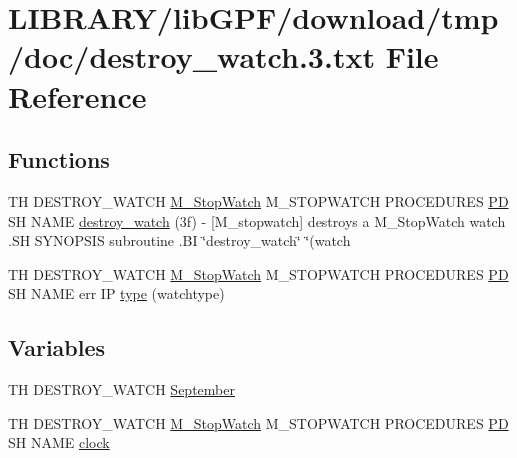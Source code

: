 \hypertarget{destroy__watch_83_8txt}{}\section{L\+I\+B\+R\+A\+R\+Y/lib\+G\+P\+F/download/tmp/doc/destroy\+\_\+watch.3.txt File Reference}
\label{destroy__watch_83_8txt}
\subsection*{Functions}
\begin{DoxyCompactItemize}
\item 
TH D\+E\+S\+T\+R\+O\+Y\+\_\+\+W\+A\+T\+CH \hyperlink{option__stopwatch_83_8txt_aa2011fc45a5e502e87ee50996a8a9305}{M\+\_\+\+Stop\+Watch} M\+\_\+\+S\+T\+O\+P\+W\+A\+T\+CH P\+R\+O\+C\+E\+D\+U\+R\+ES \hyperlink{what__overview_81_8txt_a85f26da5a4481fbdb0d9c79f2b94de3e}{PD} SH N\+A\+ME \hyperlink{destroy__watch_83_8txt_aeb23b46d3b50996f7af1c0c77c7fe713}{destroy\+\_\+watch} (3f) -\/ \mbox{[}\+M\+\_\+stopwatch\mbox{]} destroys a M\+\_\+\+Stop\+Watch watch .\+S\+H S\+Y\+N\+O\+P\+S\+I\+S subroutine .\+B\+I \char`\"{}destroy\+\_\+watch\char`\"{} \char`\"{}(watch
\item 
TH D\+E\+S\+T\+R\+O\+Y\+\_\+\+W\+A\+T\+CH \hyperlink{option__stopwatch_83_8txt_aa2011fc45a5e502e87ee50996a8a9305}{M\+\_\+\+Stop\+Watch} M\+\_\+\+S\+T\+O\+P\+W\+A\+T\+CH P\+R\+O\+C\+E\+D\+U\+R\+ES \hyperlink{what__overview_81_8txt_a85f26da5a4481fbdb0d9c79f2b94de3e}{PD} SH N\+A\+ME err IP \hyperlink{destroy__watch_83_8txt_a7bc32e4b0bf5a4206ac0c208a77e9d4b}{type} (watchtype)
\end{DoxyCompactItemize}
\subsection*{Variables}
\begin{DoxyCompactItemize}
\item 
TH D\+E\+S\+T\+R\+O\+Y\+\_\+\+W\+A\+T\+CH \hyperlink{destroy__watch_83_8txt_acabdf4ce798cad6afe1d3f1796bf4814}{September}
\item 
TH D\+E\+S\+T\+R\+O\+Y\+\_\+\+W\+A\+T\+CH \hyperlink{option__stopwatch_83_8txt_aa2011fc45a5e502e87ee50996a8a9305}{M\+\_\+\+Stop\+Watch} M\+\_\+\+S\+T\+O\+P\+W\+A\+T\+CH P\+R\+O\+C\+E\+D\+U\+R\+ES \hyperlink{what__overview_81_8txt_a85f26da5a4481fbdb0d9c79f2b94de3e}{PD} SH N\+A\+ME \hyperlink{destroy__watch_83_8txt_ac1453e74487611128ccb9ee120e5c70d}{clock}
\end{DoxyCompactItemize}


